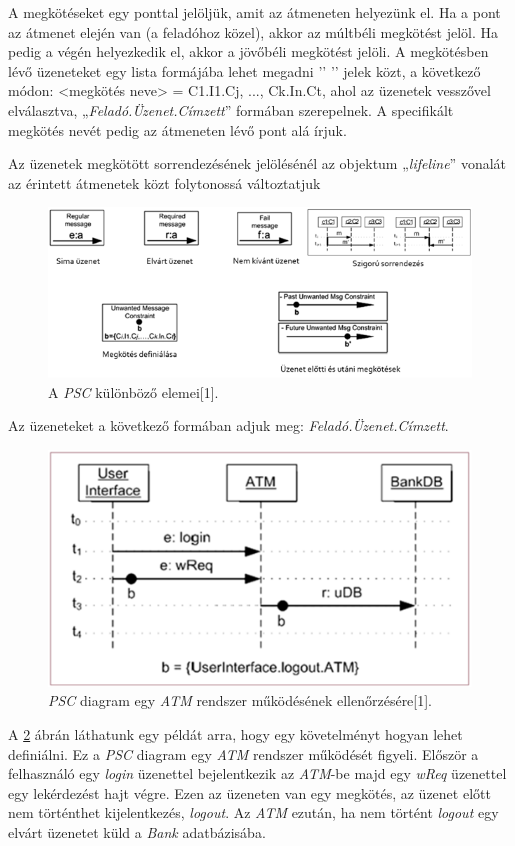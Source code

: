 A megkötéseket egy ponttal jelöljük, amit az átmeneten helyezünk el.
Ha a pont az átmenet elején van (a feladóhoz közel), akkor az múltbéli megkötést jelöl.
Ha pedig a végén helyezkedik el, akkor a jövőbéli megkötést jelöli.
A megkötésben lévő üzeneteket egy lista formájába lehet megadni ’{’ ’}’ jelek közt, a következő módon: <megkötés neve> = {C1.I1.Cj, ..., Ck.In.Ct}, ahol az üzenetek vesszővel elválasztva, „\textit{Feladó.Üzenet.Címzett}” formában szerepelnek.
A specifikált megkötés nevét pedig az átmeneten lévő pont alá írjuk.

Az üzenetek megkötött sorrendezésének jelölésénél az objektum „\textit{lifeline}” vonalát az érintett átmenetek közt folytonossá változtatjuk

\begin{figure}[!ht]
    \centering
    \includegraphics[width=150mm, keepaspectratio]{figures/2abra.png}
    \caption{A \textit{PSC} különböző elemei[1].}
    \label{psc_elemek}
\end{figure}

Az üzeneteket a következő formában adjuk meg: \textit{Feladó.Üzenet.Címzett}.

\begin{figure}[!ht]
    \centering
    \includegraphics[width=130mm, keepaspectratio]{figures/3abra.png}
    \caption{\textit{PSC} diagram egy \textit{ATM} rendszer működésének ellenőrzésére[1].}
    \label{psc_példa}
\end{figure}
A \ref{psc_példa} ábrán láthatunk egy példát arra, hogy egy követelményt hogyan lehet definiálni.
Ez a \textit{PSC} diagram egy \textit{ATM} rendszer működését figyeli.
Először a felhasználó egy \textit{login} üzenettel bejelentkezik az \textit{ATM}-be majd egy \textit{wReq} üzenettel egy lekérdezést hajt végre.
Ezen az üzeneten van egy megkötés, az üzenet előtt nem történthet kijelentkezés, \textit{logout}.
Az \textit{ATM} ezután, ha nem történt \textit{logout} egy elvárt üzenetet küld a \textit{Bank} adatbázisába.


